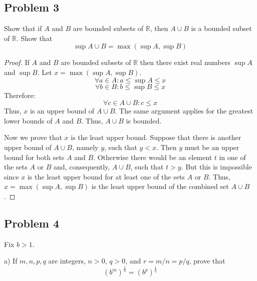 \documentclass{article}
\newcommand{\R}{\mathbb{R}}
\begin{document}
\subsection*{Problem 3}

\begin{tcolorbox}
Show that if $A$ and $B$ are bounded subsets of $\R$, then $A \cup B$ is a bounded subset of $\R$.
Show that
\[ \sup A \cup B = \max (\sup A, \sup B) \]
\end{tcolorbox}

\begin{proof}

If $A$ and $B$ are bounded subsets of $\R$ then there exist real numbers $\sup A$ and $\sup B$.
Let $x = \max (\sup A, \sup B)$.
\[ \forall a \in A : a \leq \sup A \leq x \]
\[ \forall b \in B : b \leq \sup B \leq x \]
Therefore:
\[ \forall c \in A \cup B : c \leq x \]
Thus, $x$ is an upper bound of $A \cup B$.
The same argument applies for the greatest lower bounds of $A$ and $B$.
Thus, $A \cup B$ is bounded.

Now we prove that $x$ is the least upper bound.
Suppose that there is another upper bound of $A \cup B$, namely $y$, such that $y<x$.
Then $y$ must be an upper bound for both sets $A$ and $B$.
Otherwise there would be an element $t$ in one of the sets $A$ or $B$ and, consequently, $A \cup B$, such that $t > y$.
But this is impossible since $x$ is the least upper bound for at least one of the sets $A$ or $B$.
Thus, $x = \max (\sup A, \sup B)$ is the least upper bound of the combined set $A \cup B$.

\end{proof}


\subsection*{Problem 4}

\begin{tcolorbox}
Fix $b>1$.

a) If $m, n, p, q$ are integers, $n > 0$, $q > 0$, and $r = m/n = p/q$, prove that
\begin{equation} \label{eq:1}
    (b^m)^{\frac{1}{n}} = (b^p)^{\frac{1}{q}}
\end{equation}
\end{tcolorbox}
\end{document}
